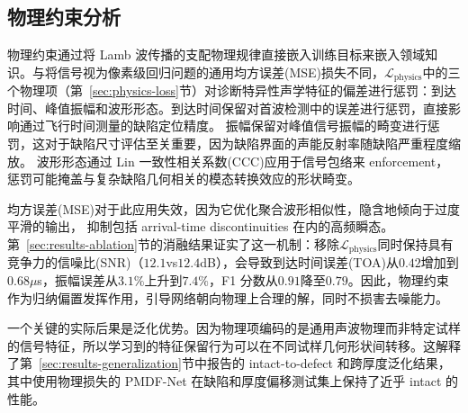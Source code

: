 \subsection{物理约束分析}
\label{sec:discussion-physics}

物理约束通过将 Lamb 波传播的支配物理规律直接嵌入训练目标来嵌入领域知识。与将信号视为像素级回归问题的通用均方误差(MSE)损失不同，$\mathcal{L}_{\text{physics}}$中的三个物理项（第~\ref{sec:physics-loss}节）对诊断特异性声学特征的偏差进行惩罚：到达时间、峰值振幅和波形形态。到达时间保留对首波检测中的误差进行惩罚，直接影响通过飞行时间测量的缺陷定位精度。
振幅保留对峰值信号振幅的畸变进行惩罚，这对于缺陷尺寸评估至关重要，因为缺陷界面的声能反射率随缺陷严重程度缩放。
波形形态通过 Lin 一致性相关系数(CCC)应用于信号包络来 enforcement，惩罚可能掩盖与复杂缺陷几何相关的模态转换效应的形状畸变。

均方误差(MSE)对于此应用失效，因为它优化聚合波形相似性，隐含地倾向于过度平滑的输出，
抑制包括 arrival-time discontinuities 在内的高频瞬态。第~\ref{sec:results-ablation}节的消融结果证实了这一机制：移除$\mathcal{L}_{\text{physics}}$同时保持具有竞争力的信噪比(SNR)（$12.1$vs$12.4$dB），会导致到达时间误差(TOA)从$0.42$增加到$0.68$$\mu$s，振幅误差从$3.1\%$上升到$7.4\%$，F1 分数从$0.91$降至$0.79$。因此，物理约束作为归纳偏置发挥作用，引导网络朝向物理上合理的解，同时不损害去噪能力。

一个关键的实际后果是泛化优势。因为物理项编码的是通用声波物理而非特定试样的信号特征，所以学习到的特征保留行为可以在不同试样几何形状间转移。这解释了第~\ref{sec:results-generalization}节中报告的 intact-to-defect 和跨厚度泛化结果，其中使用物理损失的 PMDF-Net 在缺陷和厚度偏移测试集上保持了近乎 intact 的性能。